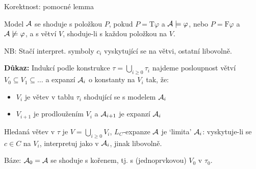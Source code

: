\documentclass{beamer}
\begin{document}
\begin{frame}{Korektnost: pomocné lemma}

    \pause
    \vspace{-6pt}
    Model $\mathcal{A}$ se \alert{shoduje} \alert{s položkou $P$}, pokud
    $P=\mathrm{T}\varphi$ a $\mathcal{A}\models\varphi$, nebo $P=\mathrm{F}\varphi$ a $\mathcal{A}\not\models\varphi$, a \alert{s větví $V$}, shoduje-li s každou položkou na $V$.
    
    \smallskip

    \pause
    
    \pause
    {\small NB: Stačí interpret. symboly $c_i$ vyskytující se na větvi, ostatní libovolně.}
   
    \pause
    \textbf{Důkaz:} \pause
    Indukcí podle konstrukce $\tau=\bigcup_{i\geq 0}\tau_i$ najdeme  posloupnost větví $V_0\subseteq V_1\subseteq\dots$ a expanzí $\mathcal{A}_i$ o konstanty na $V_i$ tak, že:\pause
     \begin{itemize}
        \item $V_i$ je větev v tablu $\tau_i$ shodující se s modelem $\mathcal{A}_i$\pause
        \item $V_{i+1}$ je prodloužením $V_i$ a $\mathcal{A}_{i+1}$ je expanzí $\mathcal{A}_i$\pause
     \end{itemize}
    Hledaná větev v $\tau$ je $V=\bigcup_{i\geq 0}V_i$, $L_C$-expanze $\mathcal{A}$ je `limita' $\mathcal{A}_i$: vyskytuje-li se $c\in C$ na $V_i$, interpretuj jako v $\mathcal{A}_i$, jinak libovolně.\pause

    \alert{Báze:} $\mathcal{A}_0=\mathcal{A}$ se shoduje s kořenem, tj. s (jednoprvkovou) $V_0$ v $\tau_0$.

\end{frame}
\end{document}
